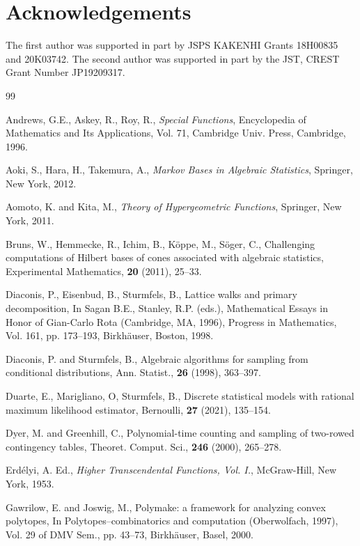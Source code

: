 \documentclass[a4paper,12pt]{article}
\theoremstyle{plain}
\theoremstyle{remark}
\begin{document}
\section*{Acknowledgements}

The first author was supported in part by JSPS KAKENHI Grants
18H00835 and 20K03742.
The second author was supported in part by the JST, CREST
Grant Number JP19209317.

\begin{thebibliography}{99}

Andrews, G.E., Askey, R., Roy, R.,
\textit{Special Functions},
Encyclopedia of Mathematics and Its Applications, Vol. 71,
Cambridge Univ. Press, Cambridge, 1996.

Aoki, S., Hara, H., Takemura, A.,
\textit{Markov Bases in Algebraic Statistics},
Springer, New York, 2012.

Aomoto, K. and Kita, M.,
\textit{Theory of Hypergeometric Functions},
Springer, New York, 2011.

Bruns, W., Hemmecke, R., Ichim, B., K\"oppe, M., S\"oger, C.,
Challenging computations of Hilbert bases of cones associated with
algebraic statistics,
Experimental Mathematics,
\textbf{20} (2011), 25--33.

Diaconis, P., Eisenbud, B., Sturmfels, B.,
Lattice walks and primary decomposition,
In Sagan B.E., Stanley, R.P. (eds.),
Mathematical Essays in Honor of Gian-Carlo Rota (Cambridge, MA, 1996),
Progress in Mathematics, Vol. 161, pp. 173--193,
Birkh\"auser, Boston, 1998.

Diaconis, P. and Sturmfels, B.,
Algebraic algorithms for sampling from conditional distributions,
Ann. Statist.,
\textbf{26} (1998), 363--397.

Duarte, E., Marigliano, O, Sturmfels, B.,
Discrete statistical models with rational maximum likelihood estimator,
Bernoulli,
\textbf{27} (2021), 135--154.
  
Dyer, M. and Greenhill, C.,
Polynomial-time counting and sampling of two-rowed contingency tables,
Theoret. Comput. Sci.,
\textbf{246} (2000), 265--278.

Erd\'elyi, A. Ed.,
\textit{Higher Transcendental Functions, Vol. I.},
McGraw-Hill, New York, 1953.

Gawrilow, E. and Joswig, M.,
Polymake: a framework for analyzing convex polytopes,
In Polytopes--combinatorics and computation (Oberwolfach, 1997),
Vol. 29 of DMV Sem., pp. 43--73,
Birkhäuser, Basel, 2000.
  

\end{thebibliography}
\end{document}
